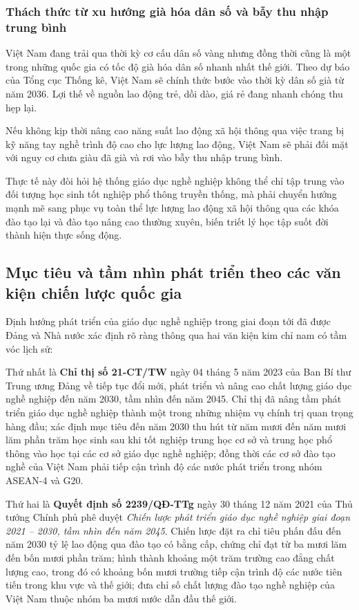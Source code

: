 \subsubsection{Thách thức từ xu hướng già hóa dân số và bẫy thu nhập trung bình}

Việt Nam đang trải qua thời kỳ cơ cấu dân số vàng nhưng đồng thời cũng là một trong những quốc gia có tốc độ già hóa dân số nhanh nhất thế giới. Theo dự báo của Tổng cục Thống kê, Việt Nam sẽ chính thức bước vào thời kỳ dân số già từ năm 2036. Lợi thế về nguồn lao động trẻ, dồi dào, giá rẻ đang nhanh chóng thu hẹp lại. 

Nếu không kịp thời nâng cao năng suất lao động xã hội thông qua việc trang bị kỹ năng tay nghề trình độ cao cho lực lượng lao động, Việt Nam sẽ phải đối mặt với nguy cơ chưa giàu đã già và rơi vào bẫy thu nhập trung bình. 

Thực tế này đòi hỏi hệ thống giáo dục nghề nghiệp không thể chỉ tập trung vào đối tượng học sinh tốt nghiệp phổ thông truyền thống, mà phải chuyển hướng mạnh mẽ sang phục vụ toàn thể lực lượng lao động xã hội thông qua các khóa đào tạo lại và đào tạo nâng cao thường xuyên, biến triết lý học tập suốt đời thành hiện thực sống động.

\subsection{Mục tiêu và tầm nhìn phát triển theo các văn kiện chiến lược quốc gia}

Định hướng phát triển của giáo dục nghề nghiệp trong giai đoạn tới đã được Đảng và Nhà nước xác định rõ ràng thông qua hai văn kiện kim chỉ nam có tầm vóc lịch sử:

Thứ nhất là \textbf{Chỉ thị số 21-CT/TW} ngày 04 tháng 5 năm 2023 của Ban Bí thư Trung ương Đảng về tiếp tục đổi mới, phát triển và nâng cao chất lượng giáo dục nghề nghiệp đến năm 2030, tầm nhìn đến năm 2045. Chỉ thị đã nâng tầm phát triển giáo dục nghề nghiệp thành một trong những nhiệm vụ chính trị quan trọng hàng đầu; xác định mục tiêu đến năm 2030 thu hút từ năm mươi đến năm mươi lăm phần trăm học sinh sau khi tốt nghiệp trung học cơ sở và trung học phổ thông vào học tại các cơ sở giáo dục nghề nghiệp; đồng thời các cơ sở đào tạo nghề của Việt Nam phải tiếp cận trình độ các nước phát triển trong nhóm ASEAN-4 và G20.

Thứ hai là \textbf{Quyết định số 2239/QĐ-TTg} ngày 30 tháng 12 năm 2021 của Thủ tướng Chính phủ phê duyệt \textit{Chiến lược phát triển giáo dục nghề nghiệp giai đoạn 2021 -- 2030, tầm nhìn đến năm 2045}. Chiến lược đặt ra chỉ tiêu phấn đấu đến năm 2030 tỷ lệ lao động qua đào tạo có bằng cấp, chứng chỉ đạt từ ba mươi lăm đến bốn mươi phần trăm; hình thành khoảng một trăm trường cao đẳng chất lượng cao, trong đó có khoảng bốn mươi trường tiếp cận trình độ các nước tiên tiến trong khu vực và thế giới; đưa chỉ số chất lượng đào tạo nghề nghiệp của Việt Nam thuộc nhóm ba mươi nước dẫn đầu thế giới.

